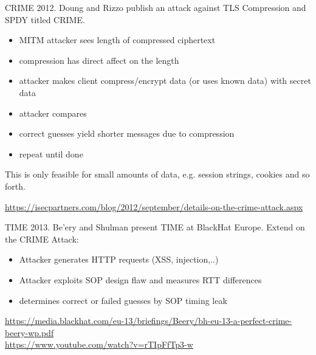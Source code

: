 \begin{frame}{CRIME}
  2012. Doung and Rizzo publish an attack against TLS Compression and SPDY titled CRIME.

  \begin{itemize}
    \item MITM attacker sees length of compressed ciphertext
    \item compression has direct affect on the length
    \item attacker makes client compress/encrypt data (or uses known data) with secret data
    \item attacker compares
    \item correct guesses yield shorter messages due to compression
    \item repeat until done
  \end{itemize}
  This is only feasible for small amounts of data, e.g. session strings, cookies and so forth.
  
  \vspace{10px}

  \tiny
  \url{https://isecpartners.com/blog/2012/september/details-on-the-crime-attack.aspx}
\end{frame}

\begin{frame}{TIME}
  2013. Be'ery and Shulman present TIME at BlackHat Europe. Extend on the CRIME Attack:
  \begin{itemize}
    \item Attacker generates HTTP requests (XSS, injection,..)
    \item Attacker exploits SOP design flaw and measures RTT differences
    \item determines correct or failed guesses by SOP timing leak
  \end{itemize}
  
  \vspace{70px}

  \tiny
  \url{https://media.blackhat.com/eu-13/briefings/Beery/bh-eu-13-a-perfect-crime-beery-wp.pdf}\\
  \url{https://www.youtube.com/watch?v=rTIpFfTp3-w}
\end{frame}

